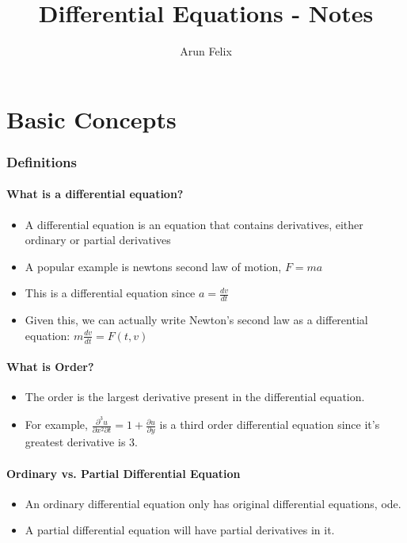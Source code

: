 \documentclass{article}
\title{Differential Equations - Notes}
\author{Arun Felix}
\begin{document}
\maketitle
\tableofcontents
\newpage
\part{Basic Concepts}
\section{Definitions}

\subsection{What is a differential equation?}

\begin{itemize}
    \item A differential equation is an equation that contains derivatives, either ordinary or partial derivatives
    \item A popular example is newtons second law of motion, $F = ma$
    \item This is a differential equation since $a = \frac{dv}{dt}$
    \item Given this, we can actually write Newton's second law as a differential equation: $m \frac{dv}{dt} = F(t,v)$
\end{itemize}

\subsection{What is Order?}

\begin{itemize}
    \item The order is the largest derivative present in the differential equation.
    \item For example, $\frac{\partial ^3 u}{\partial x^2 \partial t} = 1 + \frac{\partial u}{\partial y}$ is a third order differential equation since it's greatest derivative is 3.
\end{itemize}

\subsection{Ordinary vs. Partial Differential Equation}

\begin{itemize}
    \item An ordinary differential equation only has original differential equations, ode.
    \item A partial differential equation will have partial derivatives in it.
\end{itemize}
\end{document}
